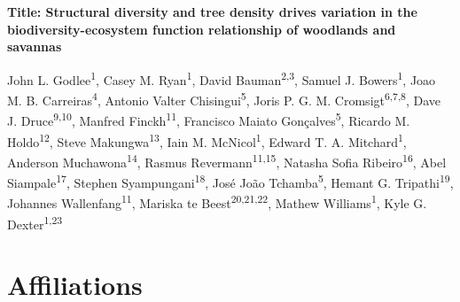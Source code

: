 \documentclass[11pt,a4paper]{article}
\begin{document}
{\textbf{Title: Structural diversity and tree density drives variation in the biodiversity-ecosystem function relationship of woodlands and savannas}}

John L. Godlee\textsuperscript{1}, Casey M. Ryan\textsuperscript{1}, David Bauman\textsuperscript{2,3}, Samuel J. Bowers\textsuperscript{1}, Joao M. B. Carreiras\textsuperscript{4}, Antonio Valter Chisingui\textsuperscript{5}, Joris P. G. M. Cromsigt\textsuperscript{6,7,8}, Dave J. Druce\textsuperscript{9,10}, Manfred Finckh\textsuperscript{11}, Francisco Maiato Gon\c{c}alves\textsuperscript{5}, Ricardo M. Holdo\textsuperscript{12}, Steve Makungwa\textsuperscript{13}, Iain M. McNicol\textsuperscript{1}, Edward T. A. Mitchard\textsuperscript{1}, Anderson Muchawona\textsuperscript{14}, Rasmus Revermann\textsuperscript{11,15}, Natasha Sofia Ribeiro\textsuperscript{16}, Abel Siampale\textsuperscript{17}, Stephen Syampungani\textsuperscript{18}, Jos\'{e} Jo\~{a}o Tchamba\textsuperscript{5}, Hemant G. Tripathi\textsuperscript{19}, Johannes Wallenfang\textsuperscript{11}, Mariska te Beest\textsuperscript{20,21,22}, Mathew Williams\textsuperscript{1}, Kyle G. Dexter\textsuperscript{1,23}

\section*{Affiliations}
\end{document}
